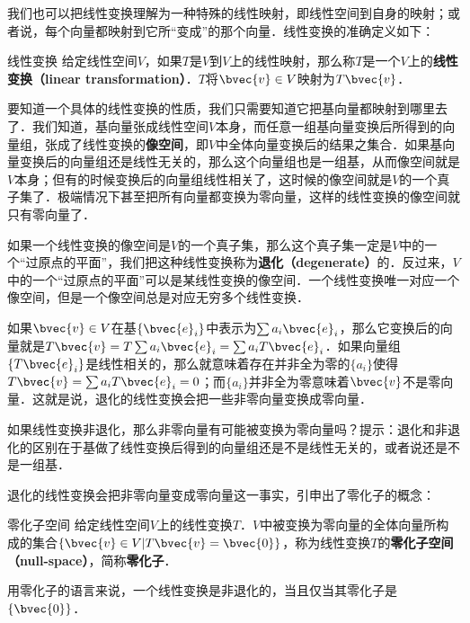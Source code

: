 我们也可以把线性变换理解为一种特殊的线性映射，即线性空间到自身的映射；或者说，每个向量都映射到它所“变成”的那个向量．线性变换的准确定义如下：

\begin{definition}{线性变换}
给定线性空间$V$，如果$T$是$V$到$V$上的线性映射，那么称$T$是一个$V$上的\textbf{线性变换（linear transformation）}．$T$将$\bvec{v}\in V$映射为$T\bvec{v}$．
\end{definition}

要知道一个具体的线性变换的性质，我们只需要知道它把基向量都映射到哪里去了．我们知道，基向量张成线性空间$V$本身，而任意一组基向量变换后所得到的向量组，张成了线性变换的\textbf{像空间}，即$V$中全体向量变换后的结果之集合．如果基向量变换后的向量组还是线性无关的，那么这个向量组也是一组基，从而像空间就是$V$本身；但有的时候变换后的向量组线性相关了，这时候的像空间就是$V$的一个真子集了．极端情况下甚至把所有向量都变换为零向量，这样的线性变换的像空间就只有零向量了．

如果一个线性变换的像空间是$V$的一个真子集，那么这个真子集一定是$V$中的一个“过原点的平面”，我们把这种线性变换称为\textbf{退化（degenerate）}的．反过来，$V$中的一个“过原点的平面”可以是某线性变换的像空间．一个线性变换唯一对应一个像空间，但是一个像空间总是对应无穷多个线性变换．

如果$\bvec{v}\in V$在基$\{\bvec{e}_i\}$中表示为$\sum a_i\bvec{e}_i$，那么它变换后的向量就是$T\bvec{v}=T\sum a_i\bvec{e}_i=\sum a_iT\bvec{e}_i$．如果向量组$\{T\bvec{e}_i\}$是线性相关的，那么就意味着存在并非全为零的$\{a_i\}$使得$T\bvec{v}=\sum a_iT\bvec{e}_i=0$；而$\{a_i\}$并非全为零意味着$\bvec{v}$不是零向量．这就是说，退化的线性变换会把一些非零向量变换成零向量．

\begin{exercise}{}
如果线性变换非退化，那么非零向量有可能被变换为零向量吗？提示：退化和非退化的区别在于基做了线性变换后得到的向量组还是不是线性无关的，或者说还是不是一组基．
\end{exercise}

退化的线性变换会把非零向量变成零向量这一事实，引申出了零化子的概念：

\begin{definition}{零化子空间}
给定线性空间$V$上的线性变换$T$．$V$中被变换为零向量的全体向量所构成的集合$\{\bvec{v}\in V|T\bvec{v}=\bvec{0}\}$，称为线性变换$T$的\textbf{零化子空间（null-space）}，简称\textbf{零化子}．
\end{definition}

用零化子的语言来说，一个线性变换是非退化的，当且仅当其零化子是$\{\bvec{0}\}$．

